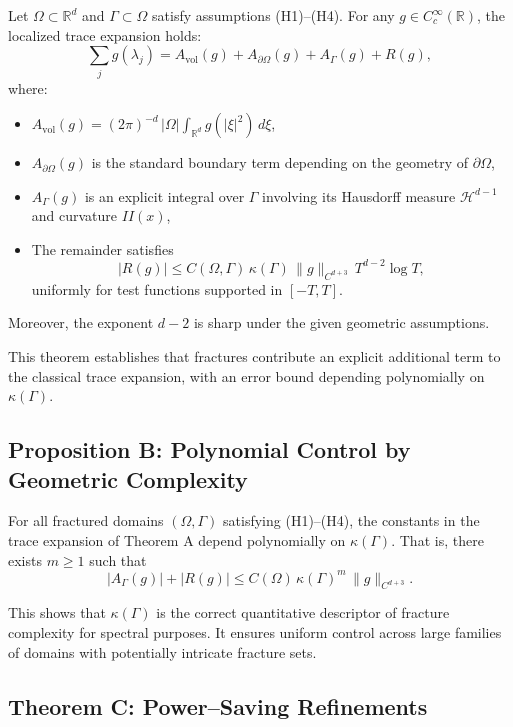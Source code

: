 \begin{theorem}
Let $\Omega \subset \mathbb R^d$ and $\Gamma \subset \Omega$ satisfy 
assumptions (H1)–(H4). For any $g\in C_c^\infty(\mathbb R)$, the localized 
trace expansion holds:
\[
  \sum_j g(\lambda_j) 
  = A_{\mathrm{vol}}(g) + A_{\partial\Omega}(g) 
    + A_\Gamma(g) + R(g),
\]
where:
\begin{itemize}
  \item $A_{\mathrm{vol}}(g) = (2\pi)^{-d}\,|\Omega| \int_{\mathbb R^d} g(|\xi|^2)\,d\xi$,
  \item $A_{\partial\Omega}(g)$ is the standard boundary term depending on 
  the geometry of $\partial\Omega$,
  \item $A_\Gamma(g)$ is an explicit integral over $\Gamma$ involving its 
  Hausdorff measure $\mathcal H^{d-1}$ and curvature $II(x)$,
  \item The remainder satisfies 
  \[
    |R(g)| \leq C(\Omega,\Gamma)\,\kappa(\Gamma)\,\|g\|_{C^{d+3}}\,T^{d-2}\log T,
  \]
  uniformly for test functions supported in $[-T,T]$.
\end{itemize}
Moreover, the exponent $d-2$ is sharp under the given geometric assumptions.
\end{theorem}

This theorem establishes that fractures contribute an explicit additional term 
to the classical trace expansion, with an error bound depending polynomially on 
$\kappa(\Gamma)$.

\subsection{Proposition B: Polynomial Control by Geometric Complexity}

\begin{proposition}
For all fractured domains $(\Omega,\Gamma)$ satisfying (H1)–(H4), the constants 
in the trace expansion of Theorem A depend polynomially on $\kappa(\Gamma)$. 
That is, there exists $m\geq 1$ such that
\[
  |A_\Gamma(g)| + |R(g)| \leq C(\Omega)\,\kappa(\Gamma)^m\,\|g\|_{C^{d+3}}.
\]
\end{proposition}

This shows that $\kappa(\Gamma)$ is the correct quantitative descriptor of 
fracture complexity for spectral purposes. It ensures uniform control across 
large families of domains with potentially intricate fracture sets.

\subsection{Theorem C: Power–Saving Refinements}

